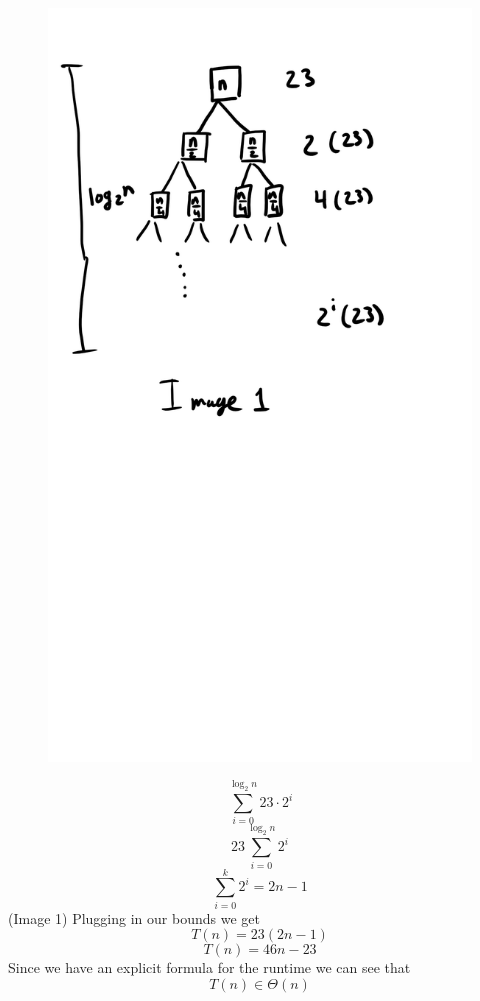 \documentclass{article}
\begin{document}
\begin{itemize}
\begin{figure}
    \includegraphics[width=\linewidth]{Image 1.png}
\end{figure}

$$ \sum_{i=0}^{\log_{2}{n}}23\cdot2^i $$
$$ 23\sum_{i=0}^{\log_{2}{n}}2^i $$
$$ \sum_{i=0}^{k}2^i = 2n-1 $$
(Image 1)
Plugging in our bounds we get
$$ T(n) = 23 (2n-1) $$
$$ T(n) = 46n-23 $$
Since we have an explicit formula for the runtime we can see that
$$ T(n) \in \Theta(n) $$


\end{itemize}
\end{document}
